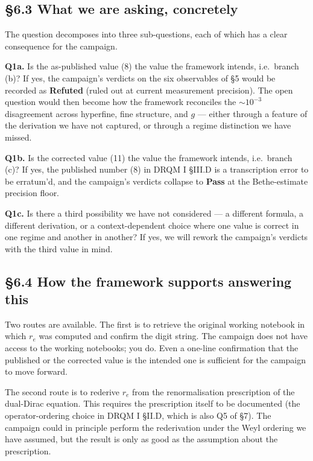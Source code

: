 \documentclass[
  11pt,
]{article}
\begin{document}
\hypertarget{what-we-are-asking-concretely}{%
\subsection{§6.3 What we are asking,
concretely}\label{what-we-are-asking-concretely}}

The question decomposes into three sub-questions, each of which has a
clear consequence for the campaign.

\textbf{Q1a.} Is the as-published value (8) the value the framework
intends, i.e.~branch (b)? If yes, the campaign's verdicts on the six
observables of §5 would be recorded as \textbf{Refuted} (ruled out at
current measurement precision). The open question would then become how
the framework reconciles the \(\sim 10^{-3}\) disagreement across
hyperfine, fine structure, and \(g\) --- either through a feature of the
derivation we have not captured, or through a regime distinction we have
missed.

\textbf{Q1b.} Is the corrected value (11) the value the framework
intends, i.e.~branch (c)? If yes, the published number (8) in DRQM I
§III.D is a transcription error to be erratum'd, and the campaign's
verdicts collapse to \textbf{Pass} at the Bethe-estimate precision
floor.

\textbf{Q1c.} Is there a third possibility we have not considered --- a
different formula, a different derivation, or a context-dependent choice
where one value is correct in one regime and another in another? If yes,
we will rework the campaign's verdicts with the third value in mind.

\hypertarget{how-the-framework-supports-answering-this}{%
\subsection{§6.4 How the framework supports answering
this}\label{how-the-framework-supports-answering-this}}

Two routes are available. The first is to retrieve the original working
notebook in which \(r_{e}\) was computed and confirm the digit string.
The campaign does not have access to the working notebooks; you do. Even
a one-line confirmation that the published or the corrected value is the
intended one is sufficient for the campaign to move forward.

The second route is to rederive \(r_{e}\) from the renormalisation
prescription of the dual-Dirac equation. This requires the prescription
itself to be documented (the operator-ordering choice in DRQM I §II.D,
which is also Q5 of §7). The campaign could in principle perform the
rederivation under the Weyl ordering we have assumed, but the result is
only as good as the assumption about the prescription.
\end{document}
